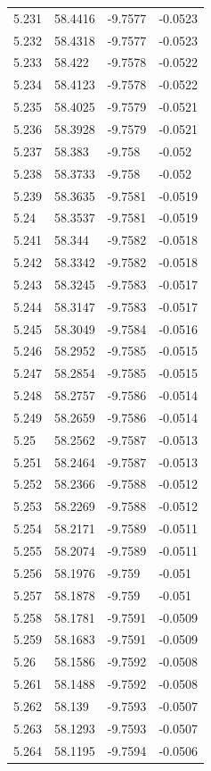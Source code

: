 \begin{tabular}{llll}
5.231 & 58.4416 & -9.7577 & -0.0523 \\
5.232 & 58.4318 & -9.7577 & -0.0523 \\
5.233 & 58.422 & -9.7578 & -0.0522 \\
5.234 & 58.4123 & -9.7578 & -0.0522 \\
5.235 & 58.4025 & -9.7579 & -0.0521 \\
5.236 & 58.3928 & -9.7579 & -0.0521 \\
5.237 & 58.383 & -9.758 & -0.052 \\
5.238 & 58.3733 & -9.758 & -0.052 \\
5.239 & 58.3635 & -9.7581 & -0.0519 \\
5.24 & 58.3537 & -9.7581 & -0.0519 \\
5.241 & 58.344 & -9.7582 & -0.0518 \\
5.242 & 58.3342 & -9.7582 & -0.0518 \\
5.243 & 58.3245 & -9.7583 & -0.0517 \\
5.244 & 58.3147 & -9.7583 & -0.0517 \\
5.245 & 58.3049 & -9.7584 & -0.0516 \\
5.246 & 58.2952 & -9.7585 & -0.0515 \\
5.247 & 58.2854 & -9.7585 & -0.0515 \\
5.248 & 58.2757 & -9.7586 & -0.0514 \\
5.249 & 58.2659 & -9.7586 & -0.0514 \\
5.25 & 58.2562 & -9.7587 & -0.0513 \\
5.251 & 58.2464 & -9.7587 & -0.0513 \\
5.252 & 58.2366 & -9.7588 & -0.0512 \\
5.253 & 58.2269 & -9.7588 & -0.0512 \\
5.254 & 58.2171 & -9.7589 & -0.0511 \\
5.255 & 58.2074 & -9.7589 & -0.0511 \\
5.256 & 58.1976 & -9.759 & -0.051 \\
5.257 & 58.1878 & -9.759 & -0.051 \\
5.258 & 58.1781 & -9.7591 & -0.0509 \\
5.259 & 58.1683 & -9.7591 & -0.0509 \\
5.26 & 58.1586 & -9.7592 & -0.0508 \\
5.261 & 58.1488 & -9.7592 & -0.0508 \\
5.262 & 58.139 & -9.7593 & -0.0507 \\
5.263 & 58.1293 & -9.7593 & -0.0507 \\
5.264 & 58.1195 & -9.7594 & -0.0506 \\

\end{tabular}
